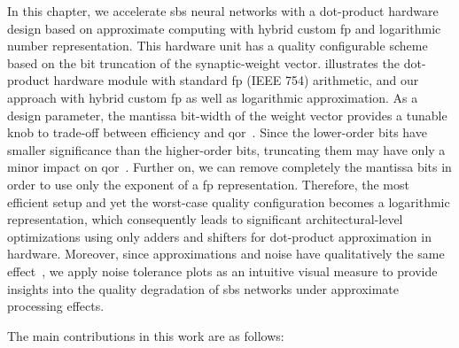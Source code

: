 In this chapter, we accelerate \gls{sbs} neural networks with a dot-product hardware design based on approximate computing with hybrid custom \gls{fp}  and logarithmic number representation. This hardware unit has a quality configurable scheme based on the bit truncation of the synaptic-weight vector.  illustrates the dot-product hardware module with standard \gls{fp} (IEEE 754) arithmetic, and our approach with hybrid custom \gls{fp}  as well as logarithmic approximation. As a design parameter, the mantissa bit-width of the weight vector provides a tunable knob to trade-off between efficiency and \gls{qor}~\cite{park2009dynamic, han2013approximate}. Since the lower-order bits have smaller significance than the higher-order bits, truncating them may have only a minor impact on \gls{qor}~\cite{gupta2011impact, mittal2016survey}. Further on, we can remove completely the mantissa bits in order to use only the exponent of a \gls{fp}  representation. Therefore, the most efficient setup and yet the worst-case quality configuration becomes a logarithmic representation, which consequently leads to significant architectural-level optimizations using only adders and shifters for dot-product approximation in hardware. Moreover, since approximations and noise have qualitatively the same effect~\cite{venkataramani2015approximate}, we apply noise tolerance plots as an intuitive visual measure to provide insights into the quality degradation of \gls{sbs} networks under approximate processing effects.

The main contributions in this work are as follows:

